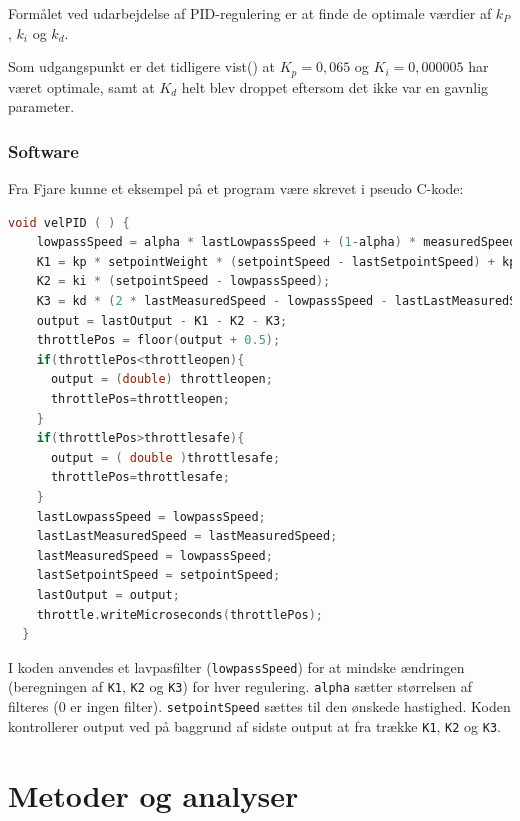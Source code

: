 Formålet ved udarbejdelse af PID-regulering er at finde de optimale værdier af $k_P$, $k_i$ og $k_d$.


Som udgangspunkt er det tidligere vist(\autocite{pid1}) at $K_p=0,065$ og $K_i=0,000005$ har været optimale, samt at $K_d$ helt blev droppet eftersom det ikke var en gavnlig parameter.

\subsection{Software}
\label{sec:software}

Fra Fjare\autocite{pid1} kunne et eksempel på et program være skrevet i pseudo C-kode:
\begin{lstlisting}[language=C,basicstyle=\ttfamily]
  void velPID ( ) {
    lowpassSpeed = alpha * lastLowpassSpeed + (1-alpha) * measuredSpeed;
    K1 = kp * setpointWeight * (setpointSpeed - lastSetpointSpeed) + kp * (lastMeasuredSpeed - lowpassSpeed);
    K2 = ki * (setpointSpeed - lowpassSpeed);
    K3 = kd * (2 * lastMeasuredSpeed - lowpassSpeed - lastLastMeasuredSpeed);
    output = lastOutput - K1 - K2 - K3;
    throttlePos = floor(output + 0.5);
    if(throttlePos<throttleopen){
      output = (double) throttleopen;
      throttlePos=throttleopen;
    }
    if(throttlePos>throttlesafe){
      output = ( double )throttlesafe;
      throttlePos=throttlesafe;
    }
    lastLowpassSpeed = lowpassSpeed;
    lastLastMeasuredSpeed = lastMeasuredSpeed;
    lastMeasuredSpeed = lowpassSpeed;
    lastSetpointSpeed = setpointSpeed;
    lastOutput = output;
    throttle.writeMicroseconds(throttlePos);
  }
\end{lstlisting}

I koden anvendes et lavpasfilter (\lstinline{lowpassSpeed}) for at mindske ændringen (beregningen af \lstinline{K1}, \lstinline{K2} og \lstinline{K3}) for hver regulering. \lstinline{alpha} sætter størrelsen af filteres (0 er ingen filter). \lstinline{setpointSpeed} sættes til den ønskede hastighed. Koden kontrollerer output ved på baggrund af sidste output at fra trække \lstinline{K1}, \lstinline{K2} og \lstinline{K3}.


\chapter[Metoder]{Metoder og analyser}
\label{sec:metode}

